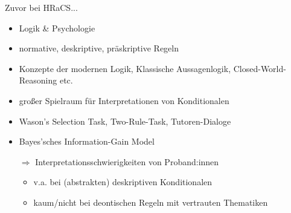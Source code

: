 
\begin{frame}{Zuvor bei HRaCS...}
    \begin{itemize}
        \item Logik \& Psychologie
        \item normative, deskriptive, präskriptive Regeln
        \pause
        
        \item Konzepte der modernen Logik, Klassische Aussagenlogik, Closed-World-Reasoning etc.
        \item großer Spielraum für Interpretationen von Konditionalen
        \pause

        \item Wason's Selection Task, Two-Rule-Task, Tutoren-Dialoge
        \item Bayes'sches Information-Gain Model
        \item[$\Rightarrow$] \alert{Interpretationsschwierigkeiten} von Proband:innen
        \begin{itemize}
            \item v.a. bei (abstrakten) deskriptiven Konditionalen
            \item kaum/nicht bei deontischen Regeln mit vertrauten Thematiken
        \end{itemize}
    \end{itemize}
\end{frame}
